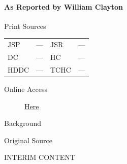 			\paragraph{As Reported by William Clayton}
				\label{EMS-1843-JS-17-MAY-1843-A-WC}
			
				\begin{description}
					\item[Print Sources]
				\end{description}

					\begin{tabular}{p{0.5in}p{1in}p{0.5in}p{1in}}
					JSP	 	& ---		& JSR 		& --- \\
					DC	 	& ---		& HC 		& --- \\
					HDDC 	& ---		& TCHC 		& --- \\
					\end{tabular}
				
				\begin{description}
					\item[Online Access] \href{https://www.josephsmithpapers.org/paper-summary/discourse-17-may-1843-a-as-reported-by-william-clayton/1}{Here}
				\end{description}
				
				\begin{description}
					\item[Background]
				\end{description}
				
				
				\begin{description}
					\item[Original Source]
				\end{description}
				
					INTERIM CONTENT
				
				
